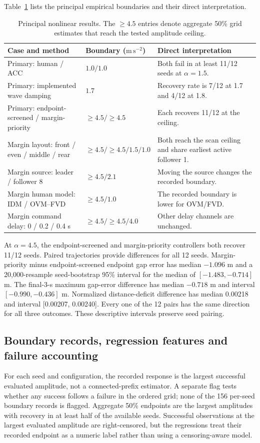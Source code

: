 \documentclass[11pt]{article}
\begin{document}
Table~\ref{tab:nonlinear} lists the principal empirical boundaries and their direct interpretation.
\begin{table}[H]\centering
\caption{Principal nonlinear results. The $\geq4.5$ entries denote aggregate 50\% grid estimates that reach the tested amplitude ceiling.}
\label{tab:nonlinear}
\begin{tabularx}{\linewidth}{>{\raggedright\arraybackslash}p{.29\linewidth}>{\centering\arraybackslash}p{.22\linewidth}>{\raggedright\arraybackslash}X}\toprule
Case and method & Boundary ($\mathrm{m\,s^{-2}}$) & Direct interpretation\\\midrule
Primary: human / ACC & $1.0/1.0$ & Both fail in at least 11/12 seeds at $\alpha=1.5$.\\
Primary: implemented wave damping & $1.7$ & Recovery rate is 7/12 at 1.7 and 4/12 at 1.8.\\
Primary: endpoint-screened / margin-priority & $\geq4.5/\geq4.5$ & Each recovers 11/12 at the ceiling.\\
Margin layout: front / even / middle / rear & $\geq4.5/\geq4.5/1.5/1.0$ & Both reach the scan ceiling and share earliest active follower 1.\\
Margin source: leader / follower 8 & $\geq4.5/2.1$ & Moving the source changes the recorded boundary.\\
Margin human model: IDM / OVM--FVD & $\geq4.5/1.0$ & The recorded boundary is lower for OVM/FVD.\\
Margin command delay: 0 / 0.2 / 0.4 s & $\geq4.5/\geq4.5/4.0$ & Other delay channels are unchanged.\\\bottomrule
\end{tabularx}
\end{table}

At $\alpha=4.5$, the endpoint-screened and margin-priority controllers both recover 11/12 seeds. Paired trajectories provide differences for all 12 seeds. Margin-priority minus endpoint-screened endpoint gap error has median $-1.096$ m and a 20,000-resample seed-bootstrap 95\% interval for the median of $[-1.483,-0.714]$ m. The final-3-s maximum gap-error difference has median $-0.718$ m and interval $[-0.990,-0.436]$ m. Normalized distance-deficit difference has median 0.00218 and interval [0.00207, 0.00240]. Every one of the 12 pairs has the same direction for all three outcomes. These descriptive intervals preserve seed pairing.

\subsection*{Boundary records, regression features and failure accounting}
For each seed and configuration, the recorded response is the largest successful evaluated amplitude, not a connected-prefix estimator. A separate flag tests whether any success follows a failure in the ordered grid; none of the 156 per-seed boundary records is flagged. Aggregate 50\% endpoints are the largest amplitudes with recovery in at least half of the available seeds. Successful observations at the largest evaluated amplitude are right-censored, but the regressions treat their recorded endpoint as a numeric label rather than using a censoring-aware model.
\end{document}

